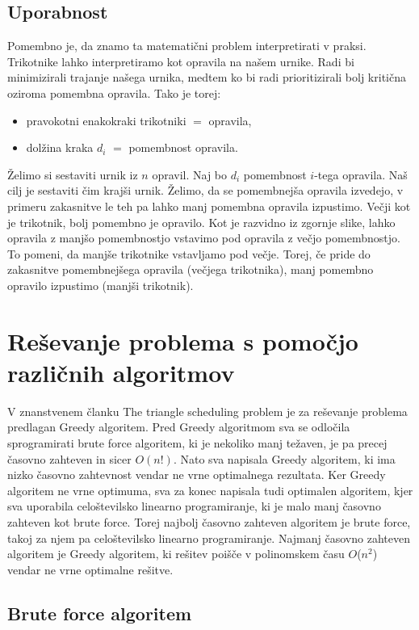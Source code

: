 \documentclass[a4paper,12pt]{article}
\theoremstyle{definition}
\theoremstyle{plain}
\begin{document}
\subsection{Uporabnost}
Pomembno je, da znamo ta matematični problem interpretirati v praksi. Trikotnike lahko interpretiramo kot opravila na našem urnike. Radi bi minimizirali trajanje našega urnika, medtem ko bi radi prioritizirali bolj kritična oziroma pomembna opravila.
Tako je torej:
\begin{itemize}
    \item pravokotni enakokraki trikotniki $=$ opravila,
    \item dolžina kraka $d_i$ $=$ pomembnost opravila.
\end{itemize}

Želimo si sestaviti urnik iz $n$ opravil. Naj bo $d_i$ pomembnost $i$-tega opravila. Naš cilj je sestaviti čim krajši urnik. Želimo, da se pomembnejša opravila izvedejo, v primeru zakasnitve le teh pa lahko manj pomembna opravila izpustimo.
Večji kot je trikotnik, bolj pomembno je opravilo. Kot je razvidno iz zgornje slike, lahko opravila z manjšo pomembnostjo vstavimo pod opravila z večjo pomembnostjo. To pomeni, da manjše trikotnike vstavljamo pod večje. Torej, če pride do zakasnitve
pomembnejšega opravila (večjega trikotnika), manj pomembno opravilo  izpustimo (manjši trikotnik).


\section{Reševanje problema s pomočjo različnih algoritmov}
V znanstvenem članku The triangle scheduling problem \cite{triangle} je za reševanje problema predlagan Greedy algoritem. Pred Greedy algoritmom sva se odločila sprogramirati brute force algoritem, ki je nekoliko manj težaven, je pa precej časovno zahteven in sicer $O(n!)$. 
Nato sva napisala Greedy algoritem, ki ima nizko časovno zahtevnost vendar ne vrne optimalnega rezultata. Ker Greedy algoritem ne vrne optimuma, sva za konec napisala tudi optimalen algoritem, kjer sva uporabila celoštevilsko linearno programiranje, ki je malo manj časovno zahteven kot brute force. Torej najbolj časovno zahteven algoritem je brute force, takoj za njem pa celoštevilsko linearno programiranje. Najmanj časovno zahteven algoritem je Greedy algoritem, ki rešitev poišče v polinomskem času $O$($n^2$) vendar ne vrne optimalne rešitve. 


\subsection{Brute force algoritem}
\end{document}
